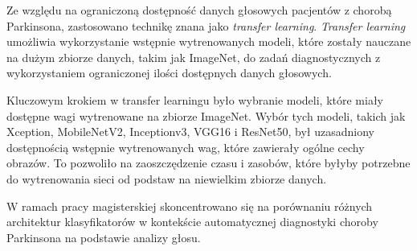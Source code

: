 Ze względu na ograniczoną dostępność danych głosowych pacjentów z chorobą Parkinsona, zastosowano technikę znana jako \emph{transfer learning}.
\emph{Transfer learning} umożliwia wykorzystanie wstępnie wytrenowanych modeli, które zostały nauczane na dużym zbiorze danych, takim jak ImageNet,
do zadań diagnostycznych z wykorzystaniem ograniczonej ilości dostępnych danych głosowych.

Kluczowym krokiem w transfer learningu było wybranie modeli, które miały dostępne wagi wytrenowane na zbiorze ImageNet.
Wybór tych modeli, takich jak Xception, MobileNetV2, Inceptionv3, VGG16 i ResNet50, był uzasadniony dostępnością wstępnie wytrenowanych wag, które zawierały ogólne cechy obrazów.
To pozwoliło na zaoszczędzenie czasu i zasobów, które byłyby potrzebne do wytrenowania sieci od podstaw na niewielkim zbiorze danych.

W ramach pracy magisterskiej skoncentrowano się na porównaniu różnych architektur klasyfikatorów w kontekście automatycznej diagnostyki choroby Parkinsona na podstawie analizy głosu.

